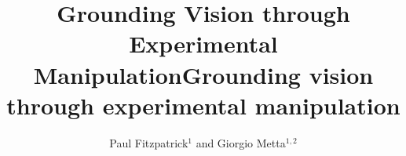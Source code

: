\documentclass[]{rspublic}
\begin{document}
 

\onecolumn





\title{Grounding Vision through Experimental Manipulation}



\title[Grounding vision]{Grounding vision through experimental manipulation}

\author[P. Fitzpatrick, G. Metta]{Paul Fitzpatrick$^1$ and Giorgio Metta$^{1,2}$}


\label{firstpage}

\maketitle

































\end{document}
